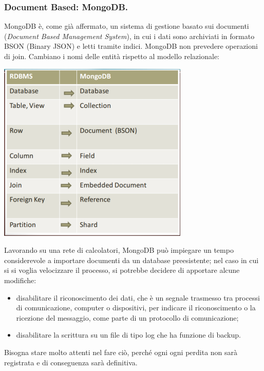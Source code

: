 \documentclass[a4page, 11pt]{article}
\begin{document}
\subsubsection{Document Based: MongoDB\cite{MongoDB, ScalingMongoDB}.}
MongoDB è, come già affermato, un sistema di gestione basato sui documenti (\textit{Document Based Management System}), in cui i dati sono archiviati in formato BSON (Binary JSON) e letti tramite indici. MongoDB non prevedere operazioni di join. Cambiano i nomi delle entità rispetto al modello relazionale:
\begin{center}
  \includegraphics[scale=0.6]{IMAGE2.jpg}
\end{center}

Lavorando su una rete di calcolatori, MongoDB può impiegare un tempo considerevole a importare documenti da un database preesistente; nel caso in cui si si voglia velocizzare il processo, si potrebbe decidere di apportare alcune modifiche:
\begin{itemize}[noitemsep]
\item disabilitare il riconoscimento dei dati, che è un segnale trasmesso tra processi di comunicazione, computer o dispositivi, per indicare il riconoscimento o la ricezione del messaggio, come parte di un protocollo di comunicazione;
\item disabilitare la scrittura su un file di tipo log che ha funzione di backup.
\end{itemize}
Bisogna stare molto attenti nel fare ciò, perché ogni ogni perdita non sarà registrata e di conseguenza sarà definitiva.
\newline
\end{document}
